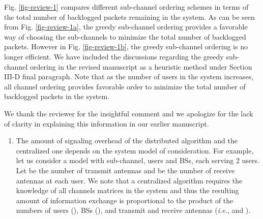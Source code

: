\begin{enumerate}
Fig. \ref{fig-review-1} compares different sub-channel ordering schemes in terms of the total number of backlogged packets remaining in the system. As can be seen from Fig. \ref{fig-review-1a}, the greedy sub-channel ordering provides a favorable way of choosing the sub-channels to minimize the total number of backlogged packets. However in Fig. \ref{fig-review-1b}, the greedy sub-channel ordering is no longer efficient. We have included the discussions regarding the greedy sub-channel ordering in the revised manuscript as a heuristic method under Section III-D final paragraph. Note that as the number of users in the system increases, all channel ordering provides favorable order to minimize the total number of backlogged packets in the system.

 

\resp
	We thank the reviewer for the insightful comment and we apologize for the lack of clarity in explaining this information in our earlier manuscript.
	\begin{enumerate}
		\item The amount of signaling overhead of the distributed algorithm and the centralized one depends on the system model of consideration. For example, let us consider a model with  sub-channel,  users and  \acp{BS}, each serving 2 users. Let  be the number of transmit antennas and  be the number of receive antennas at each user. We note that a centralized algorithm requires the knowledge of all channels matrices in the system and thus the resulting amount of information exchange is proportional to the product of the numbers of users (), \acp{BS} (), and transmit and receive antennas (\textit{i.e.},  and ).
		

\end{enumerate}
\end{enumerate}
